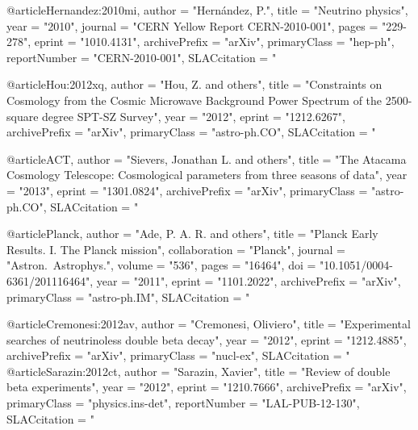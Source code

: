 @article{Hernandez:2010mi,
      author         = "Hern\'andez, P.",
      title          = "{Neutrino physics}",
      year           = "2010",
      journal = "CERN Yellow Report CERN-2010-001",
      pages = "229-278",
      eprint         = "1010.4131",
      archivePrefix  = "arXiv",
      primaryClass   = "hep-ph",
      reportNumber   = "CERN-2010-001",
      SLACcitation   = "%
}

@article{Hou:2012xq,
      author         = "Hou, Z. and others",
      title          = "{Constraints on Cosmology from the Cosmic Microwave
                        Background Power Spectrum of the 2500-square degree SPT-SZ
                        Survey}",
      year           = "2012",
      eprint         = "1212.6267",
      archivePrefix  = "arXiv",
      primaryClass   = "astro-ph.CO",
      SLACcitation   = "%
}

@article{ACT,
      author         = "Sievers, Jonathan L. and others",
      title          = "{The Atacama Cosmology Telescope: Cosmological parameters
                        from three seasons of data}",
      year           = "2013",
      eprint         = "1301.0824",
      archivePrefix  = "arXiv",
      primaryClass   = "astro-ph.CO",
      SLACcitation   = "%
}

@article{Planck,
      author         = "Ade, P. A. R. and others",
      title          = "{Planck Early Results. I. The Planck mission}",
      collaboration  = "Planck",
      journal        = "Astron.\ Astrophys.",
      volume         = "536",
      pages          = "16464",
      doi            = "10.1051/0004-6361/201116464",
      year           = "2011",
      eprint         = "1101.2022",
      archivePrefix  = "arXiv",
      primaryClass   = "astro-ph.IM",
      SLACcitation   = "%
}

@article{Cremonesi:2012av,
      author         = "Cremonesi, Oliviero",
      title          = "{Experimental searches of neutrinoless double beta
                        decay}",
      year           = "2012",
      eprint         = "1212.4885",
      archivePrefix  = "arXiv",
      primaryClass   = "nucl-ex",
      SLACcitation   = "%
}
@article{Sarazin:2012ct,
      author         = "Sarazin, Xavier",
      title          = "{Review of double beta experiments}",
      year           = "2012",
      eprint         = "1210.7666",
      archivePrefix  = "arXiv",
      primaryClass   = "physics.ins-det",
      reportNumber   = "LAL-PUB-12-130",
      SLACcitation   = "%
}

